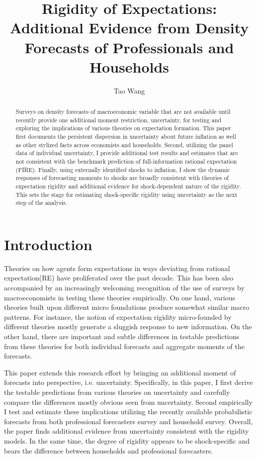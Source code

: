 \documentclass[12pt]{article}
\title{Rigidity of Expectations: Additional Evidence from Density Forecasts of Professionals and Households}
\author{Tao Wang}
\begin{document}
	
	\maketitle
	
	\begin{abstract}
		Surveys on density forecasts of macroeconomic variable that are not available until recently provide one additional moment restriction, uncertainty, for testing and exploring the implications of various theories on expectation formation. This paper first documents the persistent dispersion in uncertainty about future inflation as well as other stylized facts across economists and households.  Second,  utilizing the panel data of individual uncertainty, I provide additional test results and estimates that are not consistent with the benchmark prediction of full-information rational expectation (FIRE). Finally, using externally identified shocks to inflation, I show the dynamic responses of forecasting moments to shocks are broadly consistent with theories of expectation rigidity and additional evidence for shock-dependent nature of the rigidity.  This sets the stage for estimating shock-specific rigidity using uncertainty as the next step of the analysis.  
		
	\end{abstract}
	
	\newpage 
	
	\section{Introduction}
	
	
	Theories on how agents form expectations in ways deviating from rational expectation(RE) have proliferated over the past decade. This has been also accompanied by an increasingly welcoming recognition of the use of surveys by macroeconomists in testing these theories empirically.  On one hand, various theories built upon different micro foundations produce somewhat similar macro patterns. For instance, the notion of expectation rigidity micro-founded by different theories mostly generate a sluggish response to new information.  On the other hand, there are important and subtle differences in testable predictions from these theories for both individual forecasts and aggregate moments of the forecasts. 
	
	This paper extends this research effort by bringing an additional moment of forecasts into perspective, i.e. uncertainty. Specifically, in this paper, I first derive the testable predictions from various theories on uncertainty and carefully compare the differences mostly obvious seen from uncertainty. Second empirically I test and estimate these implications utilizing the recently available probabilistic forecasts from both professional forecasters survey and household survey. Overall, the paper finds additional evidence from uncertainty consistent with the rigidity models. In the same time, the degree of rigidity appears to be shock-specific and bears the difference between households and professional forecasters. 
	
\end{document}
